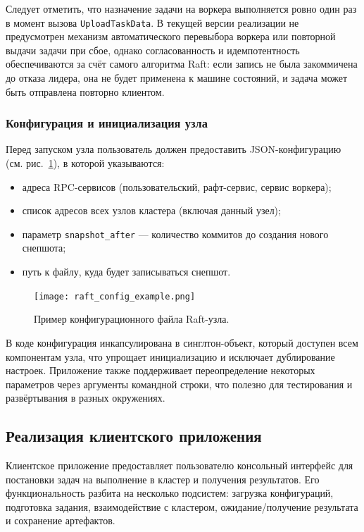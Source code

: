 Следует отметить, что назначение задачи на воркера выполняется ровно один раз в
момент вызова \texttt{UploadTaskData}. В текущей версии реализации не
предусмотрен механизм автоматического перевыбора воркера или повторной выдачи
задачи при сбое, однако согласованность и идемпотентность обеспечиваются за
счёт самого алгоритма Raft: если запись не была закоммичена до отказа лидера,
она не будет применена к машине состояний, и задача может быть отправлена
повторно клиентом.

\subsubsection{Конфигурация и инициализация узла}

Перед запуском узла пользователь должен предоставить
JSON-конфигурацию (см. рис.~\ref{fig:raftconfig}), в которой указываются:
\begin{itemize}
    \item адреса RPC-сервисов (пользовательский, рафт-сервис, сервис воркера);
    \item список адресов всех узлов кластера (включая данный узел);
    \item параметр \texttt{snapshot\_after} — количество коммитов
    до создания нового снепшота;
    \item путь к файлу, куда будет записываться снепшот.
\end{itemize}

\begin{figure}[h!]
    \centering
    \texttt{[image: raft\_config\_example.png]}
    \caption{Пример конфигурационного файла Raft-узла.}
    \label{fig:raftconfig}
\end{figure}

В коде конфигурация инкапсулирована в синглтон-объект, который доступен всем
компонентам узла, что упрощает инициализацию и исключает дублирование настроек.
Приложение также поддерживает переопределение некоторых параметров через
аргументы командной строки, что полезно для тестирования и развёртывания в
разных окружениях.

\subsection{Реализация клиентского приложения}

Клиентское приложение предоставляет пользователю консольный интерфейс для
постановки задач на выполнение в кластер и получения результатов. Его
функциональность разбита на несколько подсистем: загрузка конфигураций,
подготовка задания, взаимодействие с кластером, ожидание/получение результата и
сохранение артефактов.

